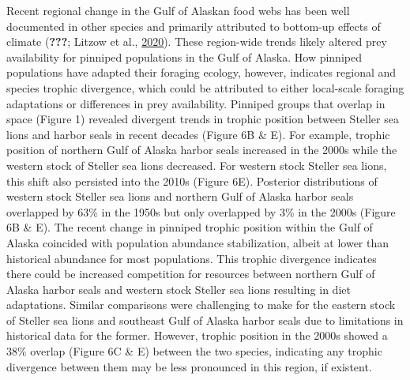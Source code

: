 \documentclass [11pt, proquest] {uwthesis}[2015/03/03]
\begin{document}
Recent regional change in the Gulf of Alaskan food webs has been well
documented in other species and primarily attributed to bottom-up
effects of climate ({\textbf{???}}; Litzow et al.,
\protect\hyperlink{ref-Litzow2020}{2020}). These region-wide trends
likely altered prey availability for pinniped populations in the Gulf of
Alaska. How pinniped populations have adapted their foraging ecology,
however, indicates regional and species trophic divergence, which could
be attributed to either local-scale foraging adaptations or differences
in prey availability. Pinniped groups that overlap in space (Figure 1)
revealed divergent trends in trophic position between Steller sea lions
and harbor seals in recent decades (Figure 6B \& E). For example,
trophic position of northern Gulf of Alaska harbor seals increased in
the 2000s while the western stock of Steller sea lions decreased. For
western stock Steller sea lions, this shift also persisted into the
2010s (Figure 6E). Posterior distributions of western stock Steller sea
lions and northern Gulf of Alaska harbor seals overlapped by 63\% in the
1950s but only overlapped by 3\% in the 2000s (Figure 6B \& E). The
recent change in pinniped trophic position within the Gulf of Alaska
coincided with population abundance stabilization, albeit at lower than
historical abundance for most populations. This trophic divergence
indicates there could be increased competition for resources between
northern Gulf of Alaska harbor seals and western stock Steller sea lions
resulting in diet adaptations. Similar comparisons were challenging to
make for the eastern stock of Steller sea lions and southeast Gulf of
Alaska harbor seals due to limitations in historical data for the
former. However, trophic position in the 2000s showed a 38\% overlap
(Figure 6C \& E) between the two species, indicating any trophic
divergence between them may be less pronounced in this region, if
existent.
\end{document}

